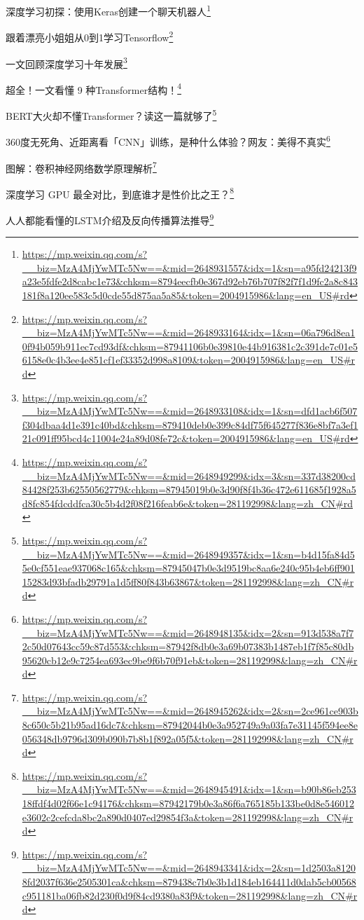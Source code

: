 \documentclass[]{ctexbook}
\renewcommand{\href}[2]{#2\footnote{\url{#1}}}
\begin{document}
\href{https://mp.weixin.qq.com/s?__biz=MzA4MjYwMTc5Nw==\&mid=2648931557\&idx=1\&sn=a95fd24213f9a23e5fdfe2d8cabc1e73\&chksm=8794eecfb0e367d92eb76b707f82f7f1d9fc2a8c843181f8a120ee583c5d0cde55d875aa5a85\&token=2004915986\&lang=en_US\#rd}{深度学习初探：使用Keras创建一个聊天机器人}

\href{https://mp.weixin.qq.com/s?__biz=MzA4MjYwMTc5Nw==\&mid=2648933164\&idx=1\&sn=06a796d8ea10f94b059b911ec7cd93df\&chksm=87941106b0e39810e44b916381c2c391de7c01e56158e0c4b3ee4e851cf1ef33352d998a8109\&token=2004915986\&lang=en_US\#rd}{跟着漂亮小姐姐从0到1学习Tensorflow}

\href{https://mp.weixin.qq.com/s?__biz=MzA4MjYwMTc5Nw==\&mid=2648933108\&idx=1\&sn=dfd1acb6f507f304dbaa4d1e391c40bd\&chksm=879410deb0e399c84df75f645277f836e8bf7a3ef121c091ff95bcd4c11004e24a89d08fe72c\&token=2004915986\&lang=en_US\#rd}{一文回顾深度学习十年发展}

\href{https://mp.weixin.qq.com/s?__biz=MzA4MjYwMTc5Nw==\&mid=2648949299\&idx=3\&sn=337d38200cd84428f253b62550562779\&chksm=87945019b0e3d90f8f4b36c472e611685f1928a5d8fc854fdcddfca30c5b4d2f08f216feab6e\&token=281192998\&lang=zh_CN\#rd}{超全！一文看懂 9 种Transformer结构！}

\href{https://mp.weixin.qq.com/s?__biz=MzA4MjYwMTc5Nw==\&mid=2648949357\&idx=1\&sn=b4d15fa84d55e0cf551eae937068c165\&chksm=87945047b0e3d9519bc8aa6e240c95b4eb6ff90115283d93bfadb29791a1d5ff80f843b63867\&token=281192998\&lang=zh_CN\#rd}{BERT大火却不懂Transformer？读这一篇就够了}

\href{https://mp.weixin.qq.com/s?__biz=MzA4MjYwMTc5Nw==\&mid=2648948135\&idx=2\&sn=913d538a7f72c50d07643cc59c87d553\&chksm=87942f8db0e3a69b07383b1487eb1f7f85c80db95620cb12e9c7254ea693ec9be9f6b70f91eb\&token=281192998\&lang=zh_CN\#rd}{360度无死角、近距离看「CNN」训练，是种什么体验？网友：美得不真实}

\href{https://mp.weixin.qq.com/s?__biz=MzA4MjYwMTc5Nw==\&mid=2648945262\&idx=2\&sn=2ce961ce903b8c650c5b21b95ad16dc7\&chksm=87942044b0e3a952749a9a03fa7e31145f594ee8e056348db9796d309b090b7b8b1f892a05f5\&token=281192998\&lang=zh_CN\#rd}{图解：卷积神经网络数学原理解析}

\href{https://mp.weixin.qq.com/s?__biz=MzA4MjYwMTc5Nw==\&mid=2648945491\&idx=1\&sn=b90b86eb25318ffdf4d02f66e1c94176\&chksm=87942179b0e3a86f6a765185b133be0d8e546012e3602c2cefcda8bc2a890d0407ed29854f3a\&token=281192998\&lang=zh_CN\#rd}{深度学习 GPU 最全对比，到底谁才是性价比之王？}

\href{https://mp.weixin.qq.com/s?__biz=MzA4MjYwMTc5Nw==\&mid=2648943341\&idx=2\&sn=1d2503a81208fd2037f636e2505301ca\&chksm=879438c7b0e3b1d184eb164411d0dab5cb00568c951181ba06fb82d230f0d9f84cd9380a83f9\&token=281192998\&lang=zh_CN\#rd}{人人都能看懂的LSTM介绍及反向传播算法推导}
\end{document}
